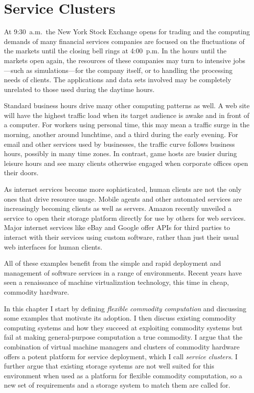 \chapter{Service Clusters}

At 9:30~a.m.\ the New York Stock Exchange opens for trading and the computing demands of many financial services companies are focused on the fluctuations of the markets until the closing bell rings at 4:00~p.m. In the hours until the markets open again, the resources of these companies may turn to intensive jobs---such as simulations---for the company itself, or to handling the processing needs of clients. The applications and data sets involved may be completely unrelated to those used during the daytime hours.

Standard business hours drive many other computing patterns as well. A web site will have the highest traffic load when its target audience is awake and in front of a computer. For workers using personal time, this may mean a traffic surge in the morning, another around lunchtime, and a third during the early evening. For email and other services used by businesses, the traffic curve follows business hours, possibly in many time zones. In contrast, game hosts are busier during leisure hours and see many clients otherwise engaged when corporate offices open their doors.

As internet services become more sophisticated, human clients are not the only ones that drive resource usage. Mobile agents and other automated services are increasingly becoming clients as well as servers. Amazon recently unveiled a service to open their storage platform directly for use by others for web services. Major internet services like eBay and Google offer APIs for third parties to interact with their services using custom software, rather than just their usual web interfaces for human clients.

All of these examples benefit from the simple and rapid deployment and management of software services in a range of environments. Recent years have seen a renaissance of machine virtualization technology, this time in cheap, commodity hardware.

In this chapter I start by defining \emph{flexible commodity computation} and discussing some examples that motivate its adoption. I then discuss existing commodity computing systems and how they succeed at exploiting commodity systems but fail at making general-purpose computation a true commodity. I argue that the combination of virtual machine managers and clusters of commodity hardware offers a potent platform for service deployment, which I call \emph{service clusters}. I further argue that existing storage systems are not well suited for this environment when used as a platform for flexible commodity computation, so a new set of requirements and a storage system to match them are called for.

